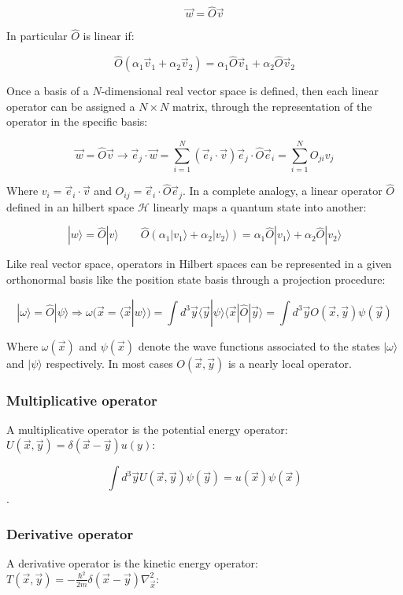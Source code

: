 	$$\vec{w} = \hat{O}\vec{v}$$

	In particular $\hat{O}$ is linear if:

	$$\hat{O}(\alpha_1\vec{v}_1 + \alpha_2\vec{v}_2) = \alpha_1\hat{O}\vec{v}_1 + \alpha_2\hat{O}\vec{v}_2$$

	Once a basis of a $N$-dimensional real vector space is defined, then each linear operator can be assigned a $N\times N$ matrix, through the representation of the operator in the specific basis:

	$$\vec{w} = \hat{O}\vec{v}\rightarrow \vec{e}_j\cdot\vec{w} = \sum\limits_{i=1}^N(\vec{e}_i\cdot\vec{v})\vec{e}_j\cdot\hat{O}\vec{e}_i = \sum\limits_{i=1}^NO_{ji}v_j$$

	Where $v_i = \vec{e}_i\cdot \vec{v}$ and $O_{ij} = \vec{e}_i\cdot\hat{O}\vec{e}_j$.
	In a complete analogy, a linear operator $\hat{O}$ defined in an hilbert space $\mathcal{H}$ linearly maps a quantum state into another:

	$$|w\rangle = \hat{O}|v\rangle\qquad \hat{O}(\alpha_1|v_1\rangle + \alpha_2|v_2\rangle) = \alpha_1\hat{O}|v_1\rangle +  \alpha_2\hat{O}|v_2\rangle$$

	Like real vector space, operators in Hilbert spaces can be represented in a given orthonormal basis like the position state basis through a projection procedure:

	$$|\omega\rangle = \hat{O}|\psi\rangle\Rightarrow \omega(\vec{x} = \langle\vec{x}|w\rangle) = \int d^3\vec{y}\langle\vec{y}|\psi\rangle\langle\vec{x}|\hat{O}|\vec{y}\rangle = \int d^3\vec{y} O(\vec{x}, \vec{y})\psi(\vec{y})$$

	Where $\omega(\vec{x})$ and $\psi(\vec{x})$ denote the wave functions associated to the states $|\omega\rangle$ and $|\psi\rangle$ respectively.
	In most cases $O(\vec{x}, \vec{y})$ is a nearly local operator.

		\subsubsection{Multiplicative operator}
		A multiplicative operator is the potential energy operator: $U(\vec{x}, \vec{y}) = \delta(\vec{x}-\vec{y})u(y)$:

		$$\int d^3\vec{y}U(\vec{x}, \vec{y})\psi(\vec{y}) = u(\vec{x})\psi(\vec{x})$$.

		\subsubsection{Derivative operator}
		A derivative operator is the kinetic energy operator: $T(\vec{x}, \vec{y}) = -\frac{\hbar^2}{2m}\delta(\vec{x}-\vec{y})\nabla^2_{\vec{x}}$:


